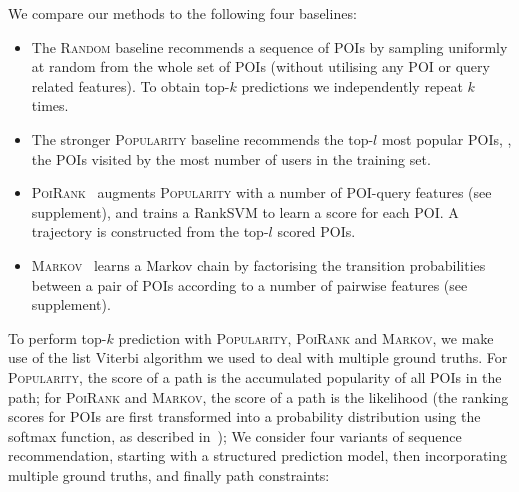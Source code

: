 We compare our methods to the following four baselines:
\begin{itemize}[leftmargin=0.125in]%
\item The \textsc{Random} baseline recommends a sequence of POIs by sampling uniformly at random from the whole set of POIs
      (without utilising any POI or query related features). 
      To obtain top-$k$ predictions we independently repeat $k$ times.

\item The stronger \textsc{Popularity} baseline recommends the top-$l$ most popular POIs,
      \ie, the POIs visited by the most number of users in the training set.

\item \textsc{PoiRank}~\cite{cikm16paper}
      augments \textsc{Popularity} with a number of POI-query features (see supplement),
      and trains a RankSVM %
      to learn a score for each POI.
      A trajectory is constructed from the top-$l$ scored POIs.

\item \textsc{Markov}~\cite{cikm16paper} learns a Markov chain by factorising the transition probabilities between a pair of POIs 
      according to a number of pairwise features (see supplement). 

\end{itemize}%
To perform top-$k$ prediction with \textsc{Popularity}, \textsc{PoiRank} and \textsc{Markov},
we make use of the 
list Viterbi algorithm
we used to deal with multiple ground truths.
For \textsc{Popularity}, the score of a path is the accumulated popularity of all POIs in the path;
for \textsc{PoiRank} and \textsc{Markov}, the score of a path is the likelihood
(the ranking scores for POIs are first transformed into a probability distribution using the softmax function, as described in~\cite{cikm16paper});
We consider four variants of sequence recommendation, starting with a structured prediction model, then incorporating multiple ground truths, and finally path constraints:
